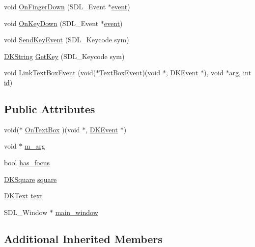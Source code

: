 \begin{DoxyCompactItemize}
\item 
void \hyperlink{class_d_k_text_box_a4170827daf045046d9cba97d2e6e186b}{On\-Finger\-Down} (S\-D\-L\-\_\-\-Event $\ast$\hyperlink{class_d_k_event_a3deebb932ed734363c4ece87971bc45f}{event})
\item 
void \hyperlink{class_d_k_text_box_a00d8df6e5248de47e45f99662ee5af45}{On\-Key\-Down} (S\-D\-L\-\_\-\-Event $\ast$\hyperlink{class_d_k_event_a3deebb932ed734363c4ece87971bc45f}{event})
\item 
void \hyperlink{class_d_k_text_box_a4256039aa324998adaec666a86275b7a}{Send\-Key\-Event} (S\-D\-L\-\_\-\-Keycode sym)
\item 
\hyperlink{_d_k_string_8h_ac168e8555ceba18e1a2919b21976bc84}{D\-K\-String} \hyperlink{class_d_k_text_box_a8cf13253b65e8bd52029bbc708c6932a}{Get\-Key} (S\-D\-L\-\_\-\-Keycode sym)
\item 
void \hyperlink{class_d_k_text_box_af6413a5ffffcc5bbab985d35777ea4e3}{Link\-Text\-Box\-Event} (void($\ast$\hyperlink{class_d_k_event_af6fca64892a14303e96e77831c06dde6}{Text\-Box\-Event})(void $\ast$, \hyperlink{class_d_k_event}{D\-K\-Event} $\ast$), void $\ast$arg, int \hyperlink{class_d_k_event_a46877918e12fcb3b2c8988379b6fa6fa}{id})
\end{DoxyCompactItemize}
\subsection*{Public Attributes}
\begin{DoxyCompactItemize}
\item 
void($\ast$ \hyperlink{class_d_k_text_box_a0f7e87f3231708211fc61dbf12cb611c}{On\-Text\-Box} )(void $\ast$, \hyperlink{class_d_k_event}{D\-K\-Event} $\ast$)
\item 
void $\ast$ \hyperlink{class_d_k_text_box_a4f4e04f99ac6df8a6fc2be8356a59f8e}{m\-\_\-arg}
\item 
bool \hyperlink{class_d_k_text_box_a1467643098fa300baaa13301a6953b8d}{has\-\_\-focus}
\item 
\hyperlink{class_d_k_square}{D\-K\-Square} \hyperlink{class_d_k_text_box_a6cd6bf1c857b5557a473dae753d3daee}{square}
\item 
\hyperlink{class_d_k_text}{D\-K\-Text} \hyperlink{class_d_k_text_box_a92959dde5c47d879ba3efce54c301386}{text}
\item 
S\-D\-L\-\_\-\-Window $\ast$ \hyperlink{class_d_k_text_box_af43c9aea5cc21a67db7bc30ce99709a6}{main\-\_\-window}
\end{DoxyCompactItemize}
\subsection*{Additional Inherited Members}


